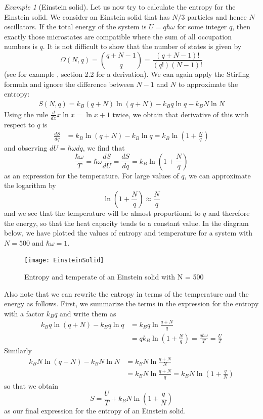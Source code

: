 \documentclass[a4paper, draft]{article}
\theoremstyle{own}
\theoremstyle{remark}
\newtheorem{example}{Example}[section]
\begin{document}
\begin{example}[Einstein solid]
Let us now try to calculate the entropy for the Einstein solid. We consider an Einstein solid that has $N/3$ particles and hence $N$ oscillators. If the total energy of the system is $U = q\hbar \omega$ for some integer $q$, then exactly those microstates are compatible where the sum of all occupation numbers is $q$. It is not difficult to show that the number of states is given by
$$
\Omega(N,q) = {\binom{q + N -1}{q}} = \frac{(q+N-1)!}{(q!)(N-1)!}
$$
(see for example \cite{Schroeder}, section 2.2 for a derivation). We can again apply the Stirling formula  and ignore the difference between $N-1$ and $N$ to approximate the entropy:
\begin{align*}
S(N,q) = k_B (q+ N) \ln (q + N) - k_B q \ln q - k_B N \ln N  
\end{align*}
Using the rule $\frac{d}{dx} x \ln x = \ln x + 1$ twice, we obtain that derivative of this with respect to $q$ is
\begin{align*}
\frac{dS}{dq} &= k_B \ln (q + N) - k_B \ln q  = k_B \ln (1 + \frac{N}{q})
\end{align*}
and observing $dU = \hbar \omega dq$, we find that
$$
\frac{\hbar \omega}{T} = \hbar \omega \frac{dS}{dU} = \frac{dS}{dq} =  k_B \ln (1 + \frac{N}{q})
$$
as an expression for the temperature. 
For large values of $q$, we can approximate the logarithm by
$$
\ln (1 + \frac{N}{q}) \approx \frac{N}{q}
$$
and we see that the temperature will be almost proportional to $q$ and therefore the energy, so that the heat capacity tends to a constant value. In the diagram below, we have plotted the values of entropy and temperature for a system with $N = 500$ and $\hbar \omega = 1$. 

\begin{figure}[ht]
\centering
\texttt{[image: EinsteinSolid]}
\caption{Entropy and temperate of an Einstein solid with N = 500}
\label{fig:EinsteinSolid}
\end{figure}

Also note that we can rewrite the entropy in terms of the temperature and the energy as follows. First, we summarize the terms in the expression for the entropy with a factor $k_B q$ and write them as
\begin{align*}
k_B q \ln (q + N) - k_B q \ln q &= k_B q \ln \frac{q + N}{q} \\
&= q k_B \ln (1 + \frac{N}{q}) = \frac{q\hbar \omega}{T} = \frac{U}{T}
\end{align*}
Similarly
\begin{align*}
k_B N \ln (q + N) -  k_B N \ln N  	&= k_B N \ln \frac{q + N}{N} \\
&= k_B N \ln  \frac{q + N}{q} = k_B N \ln (1 + \frac{q}{N}) 
\end{align*}
so that we obtain 
$$
S = \frac{U}{T} + k_B N \ln (1 + \frac{q}{N}) 
$$
as our final expression for the entropy of an Einstein solid.
\end{example}
\end{document}

